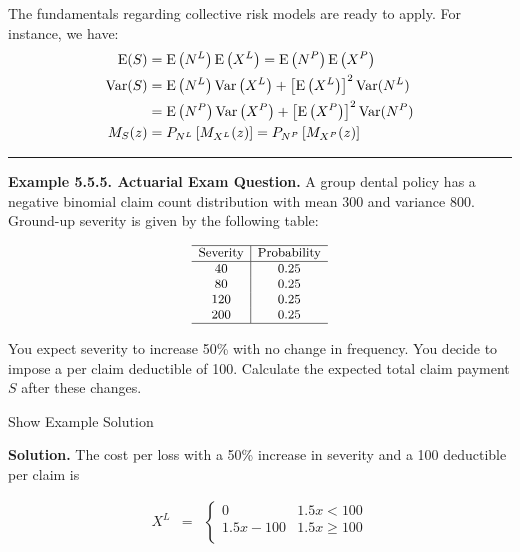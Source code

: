 \documentclass[]{book}
\theoremstyle{definition}
\theoremstyle{definition}
\theoremstyle{definition}
\theoremstyle{remark}
\begin{document}
The fundamentals regarding collective risk models are ready to apply.
For instance, we have: \[\begin{aligned}
  {\rm E}(S) &= {\rm E}\left(N^L\right) {\rm E}\left(X^L\right) = {\rm E}\left(N^P\right) {\rm E}\left(X^P\right)\\
  {\rm Var}(S) &= {\rm E}\left(N^L\right) {\rm Var}\left(X^L\right) + \left[{\rm E}\left(X^L\right)\right]^2 {\rm Var}(N^L) \\
  &= {\rm E}\left(N^P\right) {\rm Var}\left(X^P\right) + \left[{\rm E}\left(X^P\right)\right]^2 {\rm Var}(N^P)\\
  M_S(z)&=P_{N^L}\left[M_{X^L}(z)\right]=P_{N^P}\left[M_{X^P}(z)\right]
\end{aligned}\]

\begin{center}\rule{0.5\linewidth}{\linethickness}\end{center}

\textbf{Example 5.5.5. Actuarial Exam Question.} A group dental policy
has a negative binomial claim count distribution with mean 300 and
variance 800. Ground-up severity is given by the following table:

\[
{\small 
\begin{matrix}
  \begin{array}{ c | c }
    \hline
      \text{Severity} & \text{Probability}\\ \hline
    40 & 0.25\\
    80 & 0.25\\
    120 & 0.25\\
    200 & 0.25\\
    \hline
  \end{array}
\end{matrix}
}
\]

You expect severity to increase 50\% with no change in frequency. You
decide to impose a per claim deductible of 100. Calculate the expected
total claim payment \(S\) after these changes.

Show Example Solution

\hypertarget{toggleExampleAggLoss.5.5}{}
\textbf{Solution.} The cost per loss with a 50\% increase in severity
and a 100 deductible per claim is

\begin{eqnarray*}
X^L &=&
\left\{
\begin{array}{cc}
0 & 1.5x<100 \\
1.5x-100 & 1.5x\ge 100\\
\end{array}
\right.
\end{eqnarray*}
\end{document}
